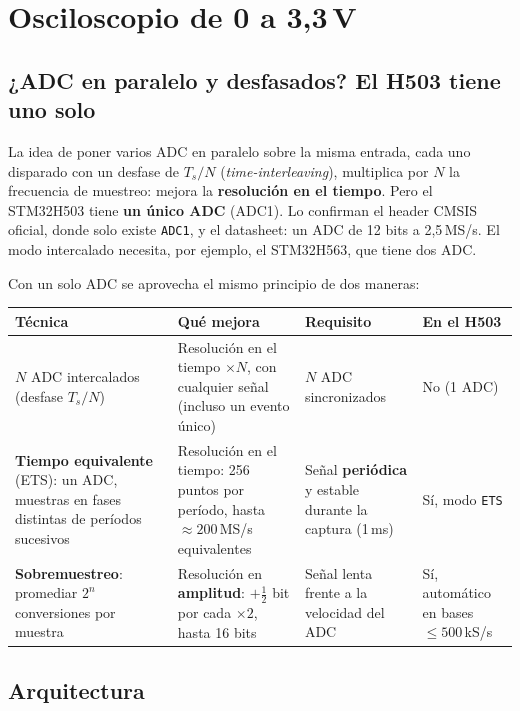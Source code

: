 \documentclass[11pt,a4paper]{article}
\begin{document}
\clearpage
\section{Osciloscopio de 0 a 3,3\,V}

\subsection{¿ADC en paralelo y desfasados? El H503 tiene uno solo}

La idea de poner varios ADC en paralelo sobre la misma entrada, cada uno
disparado con un desfase de $T_s/N$ (\emph{time-interleaving}), multiplica por
$N$ la frecuencia de muestreo: mejora la \textbf{resolución en el tiempo}. Pero
el STM32H503 tiene \textbf{un único ADC} (ADC1). Lo confirman el header CMSIS
oficial, donde solo existe \texttt{ADC1}, y el datasheet: un ADC de 12 bits a
2,5\,MS/s. El modo intercalado necesita, por ejemplo, el STM32H563, que tiene
dos ADC.

Con un solo ADC se aprovecha el mismo principio de dos maneras:

\begin{center}
\begin{tabularx}{\linewidth}{@{}>{\raggedright\arraybackslash}p{33mm}>{\raggedright\arraybackslash}X>{\raggedright\arraybackslash}X>{\raggedright\arraybackslash}p{22mm}@{}}
\toprule
\textbf{Técnica} & \textbf{Qué mejora} & \textbf{Requisito} & \textbf{En el H503} \\
\midrule
$N$ ADC intercalados (desfase $T_s/N$) & Resolución en el tiempo $\times N$, con cualquier señal (incluso un evento único) & $N$ ADC sincronizados & No (1 ADC) \\
\textbf{Tiempo equivalente} (ETS): un ADC, muestras en fases distintas de períodos sucesivos & Resolución en el tiempo: 256 puntos por período, hasta $\approx 200$\,MS/s equivalentes & Señal \textbf{periódica} y estable durante la captura (1\,ms) & Sí, modo \texttt{ETS} \\
\textbf{Sobremuestreo}: promediar $2^n$ conversiones por muestra & Resolución en \textbf{amplitud}: $+\frac{1}{2}$ bit por cada $\times 2$, hasta 16 bits & Señal lenta frente a la velocidad del ADC & Sí, automático en bases $\leq 500$\,kS/s \\
\bottomrule
\end{tabularx}
\end{center}

\subsection{Arquitectura}
\end{document}
